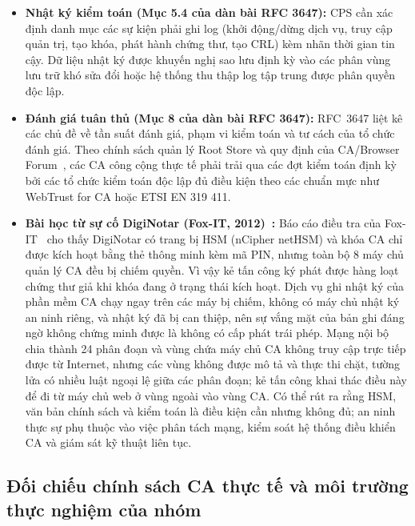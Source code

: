 \begin{itemize}\setlength{\itemsep}{1pt}\setlength{\parskip}{0pt}
    \item \textbf{Nhật ký kiểm toán (Mục 5.4 của dàn bài RFC 3647):} CPS cần xác định danh mục các sự kiện phải ghi log (khởi động/dừng dịch vụ, truy cập quản trị, tạo khóa, phát hành chứng thư, tạo CRL) kèm nhãn thời gian tin cậy. Dữ liệu nhật ký được khuyến nghị sao lưu định kỳ vào các phân vùng lưu trữ khó sửa đổi hoặc hệ thống thu thập log tập trung được phân quyền độc lập.
    
    \item \textbf{Đánh giá tuân thủ (Mục 8 của dàn bài RFC 3647):} RFC~3647 liệt kê các chủ đề về tần suất đánh giá, phạm vi kiểm toán và tư cách của tổ chức đánh giá. Theo chính sách quản lý Root Store và quy định của CA/Browser Forum~\cite{cabforum_br}, các CA công cộng thực tế phải trải qua các đợt kiểm toán định kỳ bởi các tổ chức kiểm toán độc lập đủ điều kiện theo các chuẩn mực như WebTrust for CA hoặc ETSI EN 319 411.
    
    \item \textbf{Bài học từ sự cố DigiNotar (Fox-IT, 2012)~\cite{prins2011diginotar}:} Báo cáo điều tra của Fox-IT~\cite{prins2011diginotar} cho thấy DigiNotar có trang bị HSM (nCipher netHSM) và khóa CA chỉ được kích hoạt bằng thẻ thông minh kèm mã PIN, nhưng toàn bộ 8 máy chủ quản lý CA đều bị chiếm quyền. Vì vậy kẻ tấn công ký phát được hàng loạt chứng thư giả khi khóa đang ở trạng thái kích hoạt. Dịch vụ ghi nhật ký của phần mềm CA chạy ngay trên các máy bị chiếm, không có máy chủ nhật ký an ninh riêng, và nhật ký đã bị can thiệp, nên sự vắng mặt của bản ghi đáng ngờ không chứng minh được là không có cấp phát trái phép. Mạng nội bộ chia thành 24 phân đoạn và vùng chứa máy chủ CA không truy cập trực tiếp được từ Internet, nhưng các vùng không được mô tả và thực thi chặt, tường lửa có nhiều luật ngoại lệ giữa các phân đoạn; kẻ tấn công khai thác điều này để đi từ máy chủ web ở vùng ngoài vào vùng CA. Có thể rút ra rằng HSM, văn bản chính sách và kiểm toán là điều kiện cần nhưng không đủ; an ninh thực sự phụ thuộc vào việc phân tách mạng, kiểm soát hệ thống điều khiển CA và giám sát kỹ thuật liên tục.
\end{itemize}

\subsection{Đối chiếu chính sách CA thực tế và môi trường thực nghiệm của nhóm}
\label{subsec:real-vs-lab-ca}

